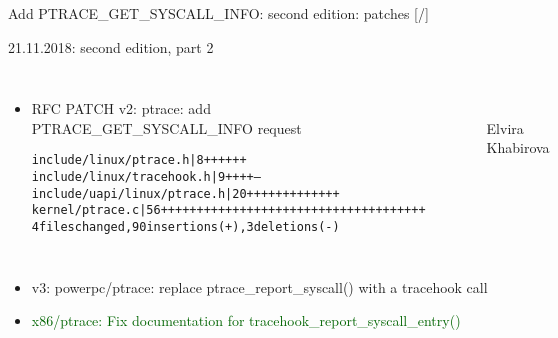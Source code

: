\documentclass[unicode,aspectratio=169,xcolor={table,dvipsnames,usernames}]{beamer}
\begin{document}
\begin{frame}[fragile]{Add PTRACE\_GET\_SYSCALL\_INFO: second edition: patches \hfill [\insertframenumber/\inserttotalframenumber]}
\Large
\begin{block}{21.11.2018: second edition, part 2}
\large
\begin{columns}
	\column{8.5cm}
\begin{itemize}
	\item RFC PATCH v2: ptrace: add PTRACE\_GET\_SYSCALL\_INFO request
\begin{alltt}
\scriptsize
include/linux/ptrace.h      |  8 ++++++
include/linux/tracehook.h   |  9 ++++--
include/uapi/linux/ptrace.h | 20 +++++++++++++
kernel/ptrace.c             | 56 +++++++++++++++++++++++++++++++++++++
4 files changed, 90 insertions(+), 3 deletions(-)
\end{alltt}
\end{itemize}
	\column{4.5cm}
		\begin{figure}
			\centering
			 \\
			Elvira Khabirova
		\end{figure}
\end{columns}
\bigskip
\begin{itemize}
	\item v3: powerpc/ptrace: replace ptrace\_report\_syscall() with a tracehook call
	\item \textcolor{darkgreen}{x86/ptrace: Fix documentation for tracehook\_report\_syscall\_entry()}
\end{itemize}
\end{block}
\end{frame}
\end{document}
